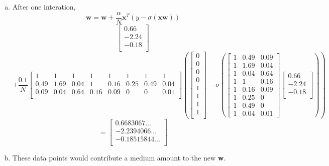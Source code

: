 \documentclass[12pt]{article}
\begin{document}
\begin{enumerate}[(a)]
	\item 
	After one interation, \[ \mathbf{w} = \textbf{w} + \dfrac{\alpha}{N}\mathbf{x}^T \left(y - \sigma{(\textbf{x}\textbf{w})}\right) \]
	\[\begin{bmatrix}
		0.66\\
		-2.24\\
		-0.18\\
	\end{bmatrix}
	\]
	\[
	+
	\dfrac{0.1}{N} 
	\begin{bmatrix}
		1 & 1 & 1 & 1 & 1 & 1 & 1 & 1\\
		0.49 & 1.69 & 0.04 & 1 & 0.16 & 0.25 & 0.49 & 0.04\\
		0.09 & 0.04 & 0.64 & 0.16 & 0.09 & 0 & 0 & 0.01\\
	\end{bmatrix}
	\left(\begin{bmatrix}
		0\\
		0\\
		0\\
		0\\
		1\\
		1\\
		1\\
		1\\
	\end{bmatrix} - 
	\sigma \left(\begin{bmatrix}
	1 & 0.49 & 0.09\\
	1 & 1.69 & 0.04\\
	1 & 0.04 & 0.64\\
	1 & 1 & 0.16\\
	1 & 0.16 & 0.09\\
	1 & 0.25 & 0\\
	1 & 0.49 & 0\\
	1 & 0.04 & 0.01
	\end{bmatrix}
	\begin{bmatrix}
		0.66\\
		-2.24\\
		-0.18\\
	\end{bmatrix}
	\right)
	\right)
	\]
	\[=\begin{bmatrix}
		0.6683067\ldots\\
		-2.2394066\ldots\\
		-0.18515844\ldots\\
	\end{bmatrix}\]

	\item These data points would contribute a medium amount to the new \textbf{w}.
	

\end{enumerate}
\end{document}
